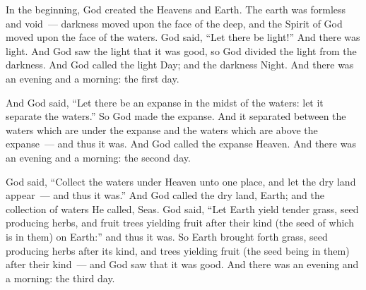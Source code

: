 
\begin{inparaenum}
   In the beginning, God created the Heavens and Earth.%
   The earth was formless and void~--- darkness moved upon the face of the deep, and the Spirit of God moved upon the face of the waters.%
   God said, ``Let there be light!'' And there was light.%
   And God saw the light that it was good, so God divided the light from the darkness.%
   And God called the light Day; and the darkness Night. And there was an evening and a morning: the first day.%
  
   And God said, ``Let there be an expanse in the midst of the waters: let it separate the waters.''%
   So God made the expanse. And it separated between the waters which are under the expanse and the waters which are above the expanse~--- and thus it was.%
   And God called the expanse Heaven. And there was an evening and a morning: the second day.%
  
   God said, ``Collect the waters under Heaven unto one place, and let the dry land appear~--- and thus it was.''%
   And God called the dry land, Earth; and the collection of waters He called, Seas.%
   God said, ``Let Earth yield tender grass, seed producing herbs, and fruit trees yielding fruit after their kind (the seed of which is in them) on Earth:'' and thus it was.%
   So Earth brought forth grass, seed producing herbs after its kind, and trees yielding fruit (the seed being in them) after their kind~--- and God saw that it was good.%
   And there was an evening and a morning: the third day.%
  

\end{inparaenum}
